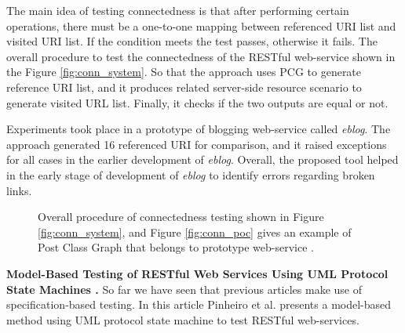\documentclass[english]{tktltiki}
\begin{document}
The main idea of testing connectedness is that after performing certain operations, there must be a one-to-one mapping between referenced URI list and visited URI list. If the condition meets the test passes, otherwise it fails. The overall procedure to test the connectedness of the RESTful web-service shown in the Figure \ref{fig:conn_system}. So that the approach uses PCG to generate reference URI list, and it produces related server-side resource scenario to generate visited URL list. Finally, it checks if the two outputs are equal or not.

Experiments took place in a prototype of blogging web-service called \textit{eblog}. The approach generated 16 referenced URI for comparison, and it raised exceptions for all cases in the earlier development of \textit{eblog}. Overall, the proposed tool helped in the early stage of development of \textit{eblog} to identify errors regarding broken links.
\begin{figure}[h]
	\centering
	\hfill%
	\caption{Overall procedure of connectedness testing shown in Figure \ref{fig:conn_system}, and Figure \ref{fig:conn_poc} gives an example of Post Class Graph that belongs to prototype web-service \cite{chakrabarti2010connectedness}.}
\end{figure}

\textbf{Model-Based Testing of RESTful Web Services Using UML Protocol State Machines \cite{pinheiro2013model}.} So far we have seen that previous articles make use of specification-based testing. In this article Pinheiro et al. \cite{pinheiro2013model} presents a model-based method using UML protocol state machine to test RESTful web-services. 
\end{document}
